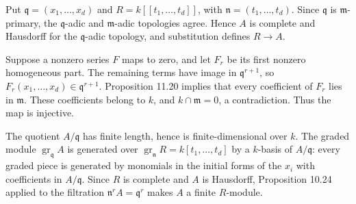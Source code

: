 Put $\mathfrak q=(x_1,\ldots,x_d)$ and $R=k[[t_1,\ldots,t_d]]$, with $\mathfrak n=(t_1,\ldots,t_d)$. Since $\mathfrak q$ is $\mathfrak m$-primary, the $\mathfrak q$-adic and $\mathfrak m$-adic topologies agree. Hence $A$ is complete and Hausdorff for the $\mathfrak q$-adic topology, and substitution defines $R\to A$.

Suppose a nonzero series $F$ maps to zero, and let $F_r$ be its first nonzero homogeneous part. The remaining terms have image in $\mathfrak q^{r+1}$, so $F_r(x_1,\ldots,x_d)\in\mathfrak q^{r+1}$. Proposition 11.20 implies that every coefficient of $F_r$ lies in $\mathfrak m$. These coefficients belong to $k$, and $k\cap\mathfrak m=0$, a contradiction. Thus the map is injective.

The quotient $A/\mathfrak q$ has finite length, hence is finite-dimensional over $k$. The graded module $\operatorname{gr}_{\mathfrak q}A$ is generated over $\operatorname{gr}_{\mathfrak n}R=k[t_1,\ldots,t_d]$ by a $k$-basis of $A/\mathfrak q$: every graded piece is generated by monomials in the initial forms of the $x_i$ with coefficients in $A/\mathfrak q$. Since $R$ is complete and $A$ is Hausdorff, Proposition 10.24 applied to the filtration $\mathfrak n^rA=\mathfrak q^r$ makes $A$ a finite $R$-module.
